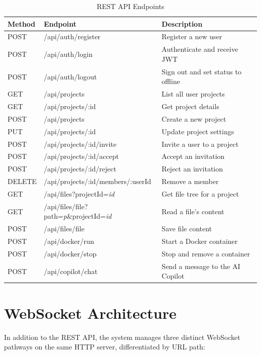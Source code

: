 \documentclass[12pt,a4paper,oneside]{report}
\begin{document}
\begin{table}[H]
\centering
\caption{REST API Endpoints}
\label{tab:api}
\begin{tabularx}{\textwidth}{llX}
\toprule
\textbf{Method} & \textbf{Endpoint} & \textbf{Description} \\
\midrule
POST & /api/auth/register & Register a new user \\
POST & /api/auth/login & Authenticate and receive JWT \\
POST & /api/auth/logout & Sign out and set status to offline \\
\midrule
GET & /api/projects & List all user projects \\
GET & /api/projects/:id & Get project details \\
POST & /api/projects & Create a new project \\
PUT & /api/projects/:id & Update project settings \\
POST & /api/projects/:id/invite & Invite a user to a project \\
POST & /api/projects/:id/accept & Accept an invitation \\
POST & /api/projects/:id/reject & Reject an invitation \\
DELETE & /api/projects/:id/members/:userId & Remove a member \\
\midrule
GET & /api/files?projectId=\textit{id} & Get file tree for a project \\
GET & /api/files/file?path=\textit{p}\&projectId=\textit{id} & Read a file's content \\
POST & /api/files/file & Save file content \\
\midrule
POST & /api/docker/run & Start a Docker container \\
POST & /api/docker/stop & Stop and remove a container \\
\midrule
POST & /api/copilot/chat & Send a message to the AI Copilot \\

\bottomrule
\end{tabularx}
\end{table}

\section{WebSocket Architecture}

In addition to the REST API, the system manages three distinct WebSocket pathways on the same HTTP server, differentiated by URL path:
\end{document}

